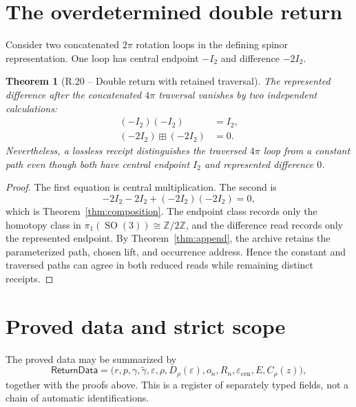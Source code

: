 \documentclass[11pt,letterpaper]{article}
\theoremstyle{returnstyle}
\newtheorem{theorem}{Theorem}[section]
\newcommand{\Z}{\mathbb{Z}}
\newcommand{\SO}{\operatorname{SO}}
\newcommand{\boxplusop}{\mathbin{\boxplus}}
\begin{document}
\section{The overdetermined double return}\label{sec:double}

Consider two concatenated $2\pi$ rotation loops in the defining spinor representation.  One loop has central endpoint $-I_2$ and difference $-2I_2$.

\begin{theorem}[R.20 -- Double return with retained traversal]\label{thm:double}
The represented difference after the concatenated $4\pi$ traversal vanishes by two independent calculations:
\begin{align*}
(-I_2)(-I_2)&=I_2,\\
(-2I_2)\boxplusop(-2I_2)&=0.
\end{align*}
Nevertheless, a lossless receipt distinguishes the traversed $4\pi$ loop from a constant path even though both have central endpoint $I_2$ and represented difference $0$.
\end{theorem}

\begin{proof}
The first equation is central multiplication.  The second is
\[
-2I_2-2I_2+(-2I_2)(-2I_2)=0,
\]
which is Theorem~\ref{thm:composition}.  The endpoint class records only the homotopy class in $\pi_1(\SO(3))\cong\Z/2\Z$, and the difference read records only the represented endpoint.  By Theorem~\ref{thm:append}, the archive retains the parameterized path, chosen lift, and occurrence address.  Hence the constant and traversed paths can agree in both reduced reads while remaining distinct receipts.
\end{proof}

\section{Proved data and strict scope}\label{sec:scope}

The proved data may be summarized by
\[
\mathsf{ReturnData}
=
\bigl(
 r,p,\gamma,\widetilde\gamma,\varepsilon,
 \rho,D_\rho(\varepsilon),o_n,R_n,
 \varepsilon_{\mathrm{cen}},E,
 C_\rho(z)
\bigr),
\]
together with the proofs above.  This is a register of separately typed fields, not a chain of automatic identifications.
\end{document}
